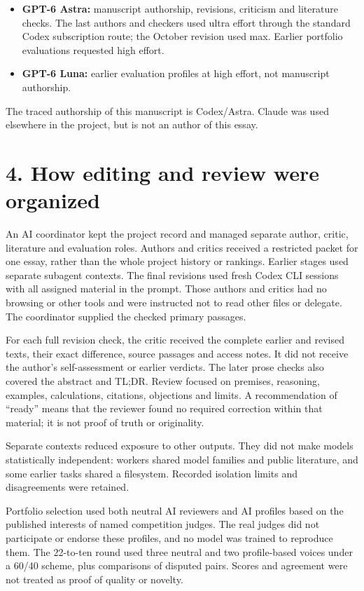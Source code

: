 \begin{itemize}
\item \textbf{GPT-6 Astra:} manuscript authorship, revisions, criticism and literature checks. The last authors and checkers used ultra effort through the standard Codex subscription route; the October revision used max. Earlier portfolio evaluations requested high effort.
\item \textbf{GPT-6 Luna:} earlier evaluation profiles at high effort, not manuscript authorship.
\end{itemize}

The traced authorship of this manuscript is Codex/Astra. Claude was used elsewhere in the project, but is not an author of this essay.

\section*{4. How editing and review were organized}

An AI coordinator kept the project record and managed separate author, critic, literature and evaluation roles. Authors and critics received a restricted packet for one essay, rather than the whole project history or rankings. Earlier stages used separate subagent contexts. The final revisions used fresh Codex CLI sessions with all assigned material in the prompt. Those authors and critics had no browsing or other tools and were instructed not to read other files or delegate. The coordinator supplied the checked primary passages.

For each full revision check, the critic received the complete earlier and revised texts, their exact difference, source passages and access notes. It did not receive the author's self-assessment or earlier verdicts. The later prose checks also covered the abstract and TL;DR. Review focused on premises, reasoning, examples, calculations, citations, objections and limits. A recommendation of “ready” means that the reviewer found no required correction within that material; it is not proof of truth or originality.

Separate contexts reduced exposure to other outputs. They did not make models statistically independent: workers shared model families and public literature, and some earlier tasks shared a filesystem. Recorded isolation limits and disagreements were retained.

Portfolio selection used both neutral AI reviewers and AI profiles based on the published interests of named competition judges. The real judges did not participate or endorse these profiles, and no model was trained to reproduce them. The 22-to-ten round used three neutral and two profile-based voices under a 60/40 scheme, plus comparisons of disputed pairs. Scores and agreement were not treated as proof of quality or novelty.

